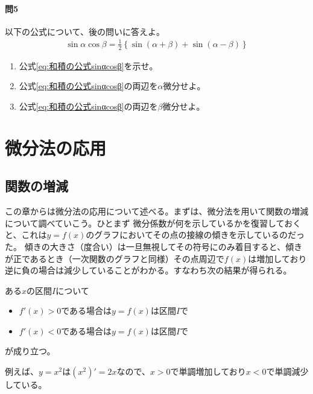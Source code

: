 \documentclass[a4j,dvipdfmx]{jsarticle}
\begin{document}
                \paragraph{問5}以下の公式について、後の問いに答えよ。
                \begin{eqnarray}
                    \sin\alpha\cos\beta=\frac{1}{2}\left\{\sin(\alpha+\beta)+\sin(\alpha-\beta)\right\}\label{eq:和積の公式sinαcosβ}
                \end{eqnarray}
                \begin{enumerate}\setcounter{enumi}{0}\renewcommand{\labelenumi}{(\arabic{enumi})}
                    \item 公式\eqref{eq:和積の公式sinαcosβ}を示せ。
                    \item 公式\eqref{eq:和積の公式sinαcosβ}の両辺を$\alpha$微分せよ。
                    \item 公式\eqref{eq:和積の公式sinαcosβ}の両辺を$\beta$微分せよ。
                \end{enumerate}
                
            \clearpage
            \section{微分法の応用}
                \subsection{関数の増減}
                    この章からは微分法の応用について述べる。まずは、微分法を用いて関数の増減について調べていこう。ひとまず
                    微分係数が何を示しているかを復習しておくと、これは$y=f(x)$のグラフにおいてその点の接線の傾きを示しているのだった。
                    傾きの大きさ（度合い）は一旦無視してその符号にのみ着目すると、傾きが正であるとき（一次関数のグラフと同様）その点周辺で$f(x)$は増加しており
                    逆に負の場合は減少していることがわかる。すなわち次の結果が得られる。
                    \begin{screen}
                        ある$x$の区間$I$について
                        \begin{itemize}
                            \item $f'(x)>0$である場合は$y=f(x)$は区間$I$で
                            \item $f'(x)<0$である場合は$y=f(x)$は区間$I$で
                        \end{itemize}
                        が成り立つ。
                    \end{screen}
                    例えば、$y=x^2$は$(x^2)'=2x$なので、$x>0$で単調増加しており$x<0$で単調減少している。
\end{document}

